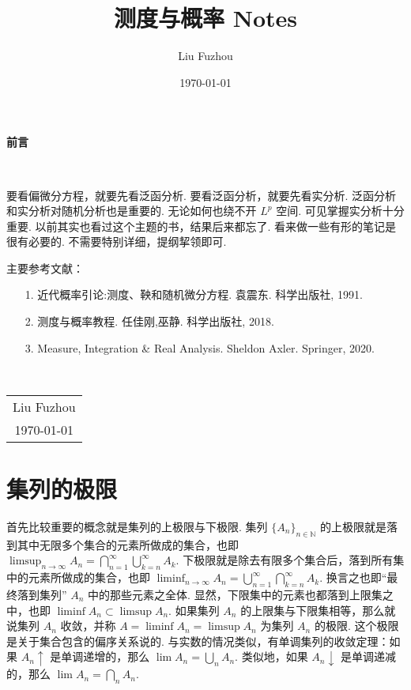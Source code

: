 \documentclass[12pt, a4paper, oneside]{book}
\title{{\Huge{\textbf{测度与概率 Notes}}}}
\author{Liu Fuzhou}
\date{\today}
\numberwithin{figure}{section}
\theoremstyle{definition}
\begin{document}
\maketitle

\setcounter{page}{1}

\begin{center}
    \Huge\textbf{前言}
\end{center}~\

要看偏微分方程，就要先看泛函分析. 要看泛函分析，就要先看实分析. 泛函分析和实分析对随机分析也是重要的. 无论如何也绕不开 $L^p$ 空间. 可见掌握实分析十分重要. 以前其实也看过这个主题的书，结果后来都忘了. 看来做一些有形的笔记是很有必要的. 不需要特别详细，提纲挈领即可.

主要参考文献：
\begin{enumerate}
\item[1.] 近代概率引论:测度、鞅和随机微分方程. 袁震东. 科学出版社, 1991.
\item[2.] 测度与概率教程. 任佳刚,巫静. 科学出版社, 2018.
\item[3.] Measure, Integration \& Real Analysis. Sheldon Axler. Springer, 2020.
\end{enumerate}

~\\
\begin{flushright}
    \begin{tabular}{c}
        Liu Fuzhou\\
        \today
    \end{tabular}
\end{flushright}

\newpage
{}
\setcounter{page}{1}
\tableofcontents
\newpage
\listoffigures
\newpage
\setcounter{page}{1}


\section{集列的极限}
首先比较重要的概念就是集列的上极限与下极限. 集列 $\{A_n\}_{n\in\mathbb N}$ 的上极限就是落到其中无限多个集合的元素所做成的集合，也即 $\limsup_{n\to\infty}A_n=\bigcap_{n=1}^\infty\bigcup_{k=n}^\infty A_k.$ 
下极限就是除去有限多个集合后，落到所有集中的元素所做成的集合，也即 $\liminf_{n\to\infty}A_n=\bigcup_{n=1}^\infty\bigcap_{k=n}^\infty A_k.$ 换言之也即“最终落到集列” $A_n$ 中的那些元素之全体.
显然，下限集中的元素也都落到上限集之中，也即 $\liminf A_n\subset \limsup A_n.$ 如果集列 $A_n$ 的上限集与下限集相等，那么就说集列 $A_n$ 收敛，并称 $A=\liminf A_n=\limsup A_n$ 为集列 $A_n$ 的极限. 这个极限是关于集合包含的偏序关系说的. 
与实数的情况类似，有单调集列的收敛定理：如果 $A_n\uparrow$ 是单调递增的，那么 $\lim A_n=\bigcup_n A_n.$ 类似地，如果 $A_n\downarrow$ 是单调递减的，那么 $\lim A_n=\bigcap_n A_n.$ 
\end{document}
